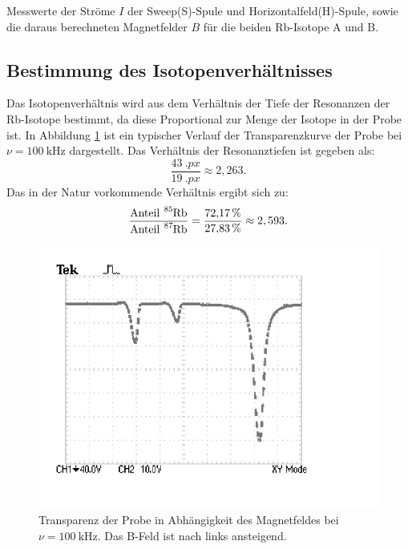 \begin{table}
	\centering
	\caption{Messwerte der Ströme $I$ der Sweep(S)-Spule und Horizontalfeld(H)-Spule, sowie die daraus berechneten Magnetfelder $B$ für die beiden Rb-Isotope A und B.}
	
	
	\label{tab:messung1}
\end{table}

\subsection{Bestimmung des Isotopenverhältnisses}

Das Isotopenverhältnis wird aus dem Verhältnis der Tiefe der Resonanzen der Rb-Isotope bestimmt, da diese Proportional zur Menge der Isotope in der Probe ist. In Abbildung \ref{fig:typisch} ist ein typischer Verlauf der Transparenzkurve der Probe bei $\nu=\SI{100}{\kilo\hertz}$ dargestellt.
Das Verhältnis der Resonanztiefen ist gegeben als:
\[
\frac{\SI{43}{.{px}}}{\SI{19}{.{px}}} \approx 2,263 \text{.}
\]
Das in der Natur vorkommende Verhältnis ergibt sich zu:
\[
\frac{\text{Anteil}~ \ce{^{85}Rb}}{\text{Anteil}~ \ce{^{87}Rb}}=\frac{\SI{72,17}{\%}}{\SI{27,83}{\%}} \approx 2,593 \text{.}
\]
\begin{figure}
	\centering
	\includegraphics[width=\linewidth-60pt,height=\textheight-60pt,keepaspectratio]{content/images/TEK0006.pdf}
	\caption{Transparenz der Probe in Abhängigkeit des Magnetfeldes bei $\nu=\SI{100}{\kilo\hertz}$. Das B-Feld ist nach links ansteigend.}
	\label{fig:typisch}
\end{figure}

